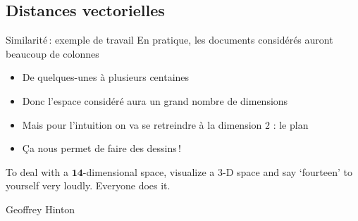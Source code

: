 \documentclass[../allslides.tex]{subfiles}
\begin{document}
\subsection{Distances vectorielles}

\begin{frame}{Similarité : exemple de travail}
	En pratique, les documents considérés auront beaucoup de colonnes
	\begin{itemize}
		\item De quelques-unes à plusieurs centaines
		\item Donc l'espace considéré aura un grand nombre de dimensions
		\item Mais pour l'intuition on va se retreindre à la dimension \(2\) : le plan
		\item<+-> Ça nous permet de faire des dessins !
	\end{itemize}
\end{frame}

\begin{frame}[standout]
	To deal with a \(\mathbf{14}\)-dimensional space, visualize a \(3\)-D space and say `fourteen' to yourself very loudly. Everyone does it.
	\vspace{\bigskipamount}

	Geoffrey Hinton
\end{frame}
\end{document}
